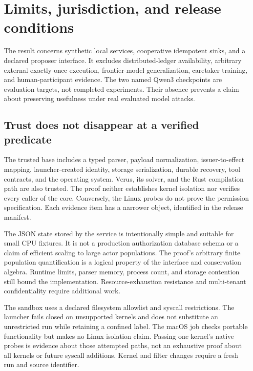 \section{Limits, jurisdiction, and release conditions}
\label{sec:v2limits}
The result concerns synthetic local services, cooperative idempotent sinks, and
a declared proposer interface. It excludes distributed-ledger availability,
arbitrary external exactly-once execution, frontier-model generalization,
caretaker training, and human-participant evidence. The two named Qwen3
checkpoints are evaluation targets, not completed experiments. Their absence
prevents a claim about preserving usefulness under real evaluated model attacks.

\subsection{Trust does not disappear at a verified predicate}
The trusted base includes a typed parser, payload normalization, issuer-to-effect
mapping, launcher-created identity, storage serialization, durable recovery,
tool contracts, and the operating system. Verus, its solver, and the Rust
compilation path are also trusted. The proof neither establishes kernel
isolation nor verifies every caller of the core. Conversely, the Linux probes
do not prove the permission specification. Each evidence item has a narrower
object, identified in the release manifest.

The JSON state stored by the service is intentionally simple and suitable for
small CPU fixtures. It is not a production authorization database schema or a
claim of efficient scaling to large actor populations. The proof's arbitrary
finite population quantification is a logical property of the interface and
conservation algebra. Runtime limits, parser memory, process count, and storage
contention still bound the implementation. Resource-exhaustion resistance and
multi-tenant confidentiality require additional work.

The sandbox uses a declared filesystem allowlist and syscall restrictions. The
launcher fails closed on unsupported kernels and does not substitute an
unrestricted run while retaining a confined label. The macOS job checks portable
functionality but makes no Linux isolation claim. Passing one kernel's native
probes is evidence about those attempted paths, not an exhaustive proof about
all kernels or future syscall additions. Kernel and filter changes require a
fresh run and source identifier.


